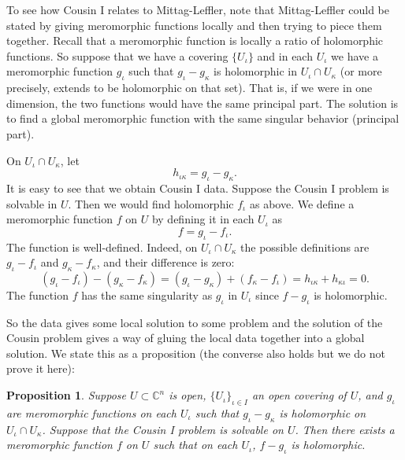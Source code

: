 \documentclass[12pt,openany]{book}
\newcommand{\C}{{\mathbb{C}}}
\theoremstyle{plain}
\newtheorem{prop}[thm]{Proposition}
\theoremstyle{remark}
\theoremstyle{definition}
\theoremstyle{exercise}
\theoremstyle{example}
\begin{document}
To see how Cousin I relates to Mittag-Leffler, note that Mittag-Leffler
could be stated by giving meromorphic functions locally and then trying
to piece them together.
Recall that a meromorphic function is locally
a ratio of holomorphic functions.
So suppose that we have a covering $\{ U_\iota \}$ and
in each $U_\iota$ we have a meromorphic function $g_\iota$ such that
$g_{\iota}-g_{\kappa}$
is holomorphic in $U_{\iota} \cap U_{\kappa}$ (or more precisely, extends to
be holomorphic on that set).  That is, if we were in one
dimension, the two functions would have the same principal part.
The solution is to find a global meromorphic function with the same
singular behavior (principal part).

On $U_\iota \cap U_\kappa$, let
\begin{equation*}
h_{\iota\kappa} = g_\iota-g_\kappa .
\end{equation*}
It is easy to see that we obtain Cousin I data.  Suppose
the Cousin I problem is solvable in $U$.  Then we would find
holomorphic $f_{\iota}$ as above.  We define a meromorphic function $f$
on $U$
by defining it in each $U_\iota$ as
\begin{equation*}
f = g_\iota - f_\iota .
\end{equation*}
The function is well-defined.  Indeed, on $U_\iota \cap U_\kappa$ the
possible definitions are
$g_\iota - f_\iota$
and
$g_\kappa - f_\kappa$, and their difference is zero:
\begin{equation*}
(g_\iota - f_\iota)-
(g_\kappa - f_\kappa)
=
(g_\iota - g_\kappa)
+
(f_\kappa - f_\iota)
=
h_{\iota\kappa}+h_{\kappa\iota} = 0.
\end{equation*}
The function $f$ has the same singularity as $g_\iota$ in $U_\iota$ since
$f-g_\iota$ is holomorphic.

So the data gives some local solution to some problem
and the solution of the Cousin problem gives
a way of gluing the local data together into a global solution.  We state
this as a proposition (the converse also holds but we do not prove it here):

\begin{prop}
Suppose $U \subset \C^n$ is open,
$\{ U_{\iota} \}_{\iota \in I}$ an open covering of $U$, and $g_\iota$
are meromorphic functions on each $U_\iota$ such that $g_\iota - g_\kappa$
is holomorphic on $U_\iota \cap U_\kappa$.  Suppose that the Cousin I
problem is solvable on $U$.  Then there exists a meromorphic function $f$ on
$U$ such that on each $U_\iota$, $f-g_\iota$ is holomorphic.
\end{prop}
\end{document}
